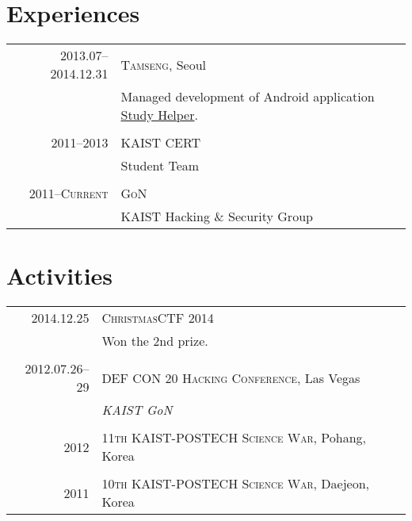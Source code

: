 \documentclass[a4paper,10pt]{article}
\begin{document}
\section{Experiences}
\begin{tabular}{r|p{11cm}}
  \textsc{2013.07--2014.12.31} & \textsc{Tamseng}, Seoul \\
  & Managed development of Android application \href{https://play.google.com/store/apps/details?id=kr.co.tamseng.StudyHelper}{Study Helper}. \\
  \multicolumn{2}{c}{} \\

  \textsc{2011--2013} & \textsc{KAIST CERT} \\
  & Student Team \\
  \multicolumn{2}{c}{} \\

  \textsc{2011--Current} & \textsc{GoN} \\
  & KAIST Hacking \& Security Group \\
\end{tabular}

\section{Activities}
\begin{tabular}{r|p{11cm}}
  \textsc{2014.12.25} & \textsc{ChristmasCTF 2014} \\
  & Won the 2nd prize. \\
  \multicolumn{2}{c}{} \\

  \textsc{2012.07.26--29} & \textsc{DEF CON 20 Hacking Conference}, Las Vegas \\
  & \emph{KAIST GoN} \\
  \multicolumn{2}{c}{} \\

  \textsc{2012} & \textsc{11th KAIST-POSTECH Science War}, Pohang, Korea \\
  \multicolumn{2}{c}{} \\

  \textsc{2011} & \textsc{10th KAIST-POSTECH Science War}, Daejeon, Korea \\
\end{tabular}

\end{document}
